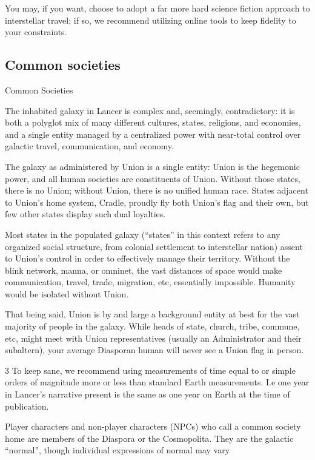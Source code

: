 You may, if you want, choose to adopt a far more hard science fiction approach to interstellar
travel; if so, we recommend utilizing online tools to keep fidelity to your constraints.




\subsection{Common societies}
Common Societies

The inhabited galaxy in Lancer is complex and, seemingly, contradictory: it is both a polyglot mix
of many different cultures, states, religions, and economies, and a single entity managed by a
centralized power with near-total control over galactic travel, communication, and economy.


The galaxy as administered by Union is a single entity: Union is the hegemonic power, and all
human societies are constituents of Union. Without those states, there is no Union; without
Union, there is no unified human race. States adjacent to Union’s home system, Cradle, proudly
fly both Union’s flag and their own, but few other states display such dual loyalties.


Most states in the populated galaxy (“states” in this context refers to any organized social
structure, from colonial settlement to interstellar nation) assent to Union’s control in order to
effectively manage their territory. Without the blink network, manna, or omninet, the vast
distances of space would make communication, travel, trade, migration, etc, essentially
impossible. Humanity would be isolated without Union.


That being said, Union is by and large a background entity at best for the vast majority of people
in the galaxy. While heads of state, church, tribe, commune, etc, might meet with Union
representatives (usually an Administrator and their subaltern), your average Diasporan human will
never see a Union flag in person.


3 To keep sane, we recommend using measurements of time equal to or simple orders of magnitude more
or less than standard Earth measurements. I.e one year in Lancer’s narrative present is the same as one
year on Earth at the time of publication.




Player characters and non-player characters (NPCs) who call a common society home are
members of the Diaspora or the Cosmopolita. They are the galactic “normal”, though individual
expressions of normal may vary


